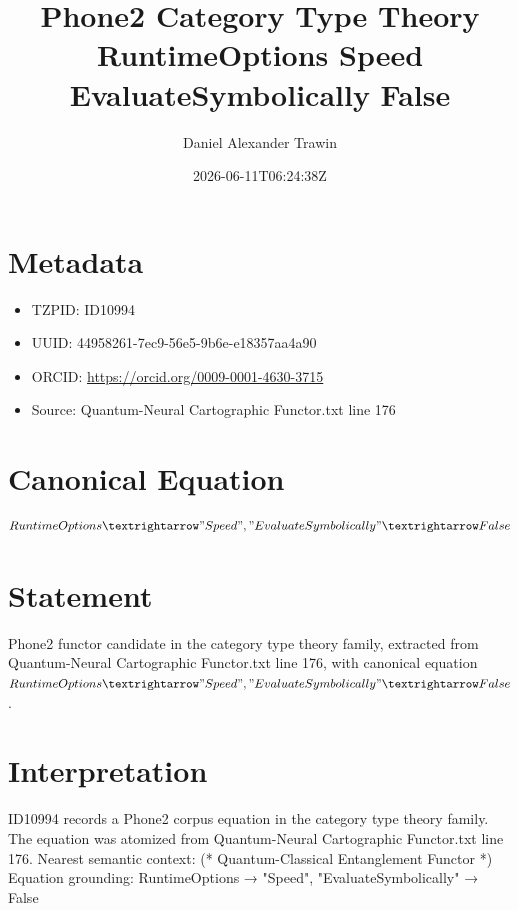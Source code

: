 \documentclass[11pt]{article}
\title{Phone2 Category Type Theory RuntimeOptions Speed EvaluateSymbolically False}
\author{Daniel Alexander Trawin}
\date{2026-06-11T06:24:38Z}
\begin{document}
\maketitle
\section*{Metadata}
\begin{itemize}
\item TZPID: ID10994
\item UUID: 44958261-7ec9-56e5-9b6e-e18357aa4a90
\item ORCID: \url{https://orcid.org/0009-0001-4630-3715}
\item Source: Quantum-Neural Cartographic Functor.txt line 176
\end{itemize}
\section*{Canonical Equation}
\[
RuntimeOptions → {"Speed", "EvaluateSymbolically" → False}
\]
\section*{Statement}
Phone2 functor candidate in the category type theory family, extracted from Quantum-Neural Cartographic Functor.txt line 176, with canonical equation $RuntimeOptions → {"Speed", "EvaluateSymbolically" → False}$.
\section*{Interpretation}
ID10994 records a Phone2 corpus equation in the category type theory family. The equation was atomized from Quantum-Neural Cartographic Functor.txt line 176. Nearest semantic context: (* Quantum-Classical Entanglement Functor *) Equation grounding: RuntimeOptions → {"Speed", "EvaluateSymbolically" → False}
\end{document}
